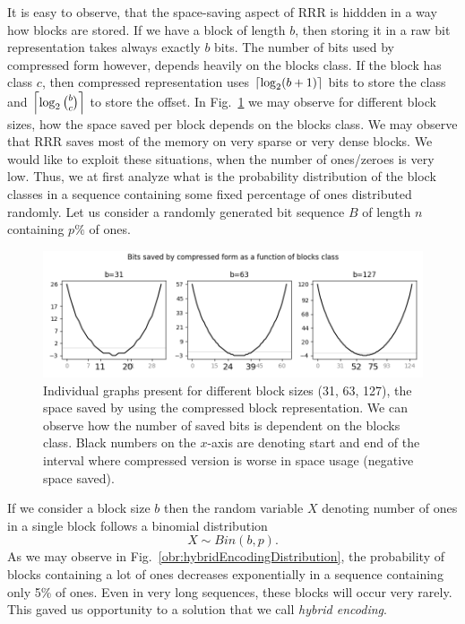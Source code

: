 It is easy to observe, that the space-saving aspect of RRR is hiddden in a way how blocks are stored.
If we have a block of length $b$, then storing it in a raw bit representation takes always exactly $b$ bits.
The number of bits used by compressed form however, depends heavily on the blocks class. If the block
has class $c$, then compressed representation uses $\left\lceil \log_2 (b+1) \right\rceil$ bits to store the
class and $\left\lceil \log_2{b\choose c} \right\rceil$ to store the offset. In Fig.~\ref{obr:rrrSpaceSavings}
we may observe for different block sizes, how the space saved per block depends on the blocks
class. We may observe that RRR saves most of the memory on very sparse or very dense blocks.
We would like to exploit these situations, when the number of ones/zeroes is very low. Thus,
we at first analyze what is the probability distribution of the block classes in a sequence
containing some fixed percentage of ones distributed randomly. Let us consider a randomly generated
bit sequence $B$ of length $n$ containing $p\%$ of ones.

\begin{figure}
	\centerline{
		\includegraphics[width=\textwidth]{images/rrr_space_savings}
	}
	\caption[TODO]{Individual graphs present for different block sizes (31, 63, 127), 
    the space saved by using the compressed block representation. We can observe how
    the number of saved bits is dependent on the blocks class. Black numbers on the $x$-axis
    are denoting start and end of the interval where compressed version is worse
    in space usage (negative space saved).
	}
	\label{obr:rrrSpaceSavings}
\end{figure}

If we consider a block size $b$ then the random variable $X$ denoting number of ones in
a single block follows a binomial distribution $$X \sim Bin(b,p).$$ As we may observe in
Fig.~\ref{obr:hybridEncodingDistribution}, the probability of blocks
containing a lot of ones decreases exponentially in a sequence containing only 5\% of ones.
Even in very long sequences, these blocks will occur very rarely. This gaved us
opportunity to a solution that we call \textit{hybrid encoding}.

